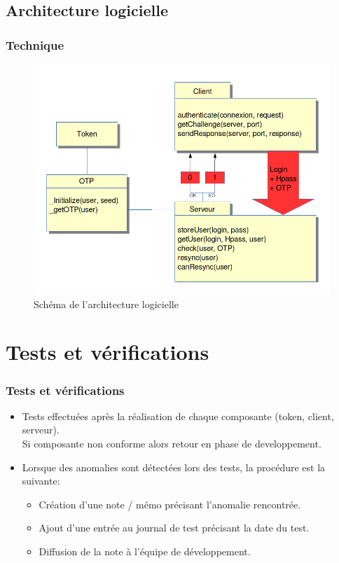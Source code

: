 \documentclass[xcolor=table]{beamer}
\begin{document}
\subsection{Architecture logicielle}
\begin{frame}
\frametitle{Technique}
\begin{figure}
 \includegraphics[scale=0.3]{img/architecture.png} %
 \caption{Schéma de l'architecture logicielle}
\end{figure}

\end{frame}


\section{Tests et vérifications}

\begin{frame}
  \frametitle{Tests et vérifications}
  \begin{itemize}
   \item Tests effectuées après la réalisation de chaque composante (token, client, serveur). \\Si composante non conforme alors retour en phase de developpement.
   \item  Lorsque des anomalies sont détectées lors des tests, la procédure est la suivante:
    \begin{itemize}
     \item Création d'une note / mémo précisant l'anomalie rencontrée.
     \item Ajout d'une entrée au journal de test précisant la date du test.
     \item Diffusion de la note à l'équipe de développement.
    \end{itemize}
  \end{itemize}
\end{frame}
\end{document}
